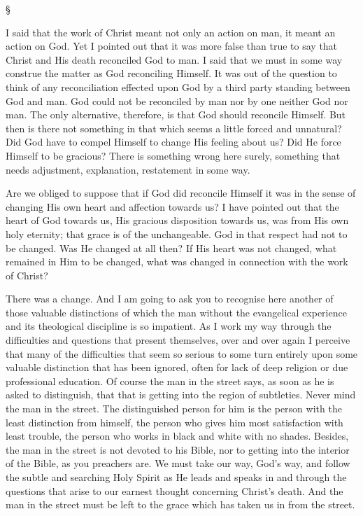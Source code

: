 \documentclass[12pt,a5paper,twoside,titlepage]{book}
\begin{document}
\begin{center}
\S
\end{center}

I said that the work of Christ meant not only 
an action on man, it meant an action on God. 
Yet I pointed out that it was more false than 
true to say that Christ and His death reconciled 
God to man. I said that we must in some way 
construe the matter as God reconciling Himself. 
It was out of the question to think of any 
reconciliation effected upon God by a third 
party standing between God and man. God 
could not be reconciled by man nor by one 
neither God nor man. The only alternative, 
therefore, is that God should reconcile Himself. 
But then is there not something in that which 
seems a little forced and unnatural? Did God 
have to compel Himself to change His feeling 
about us? Did He force Himself to be gracious? 
There is something wrong here surely, something 
that needs adjustment, explanation, restatement 
in some way. 

Are we obliged to suppose that if God did 
reconcile Himself it was in the sense of changing 
His own heart and affection towards us? I 
have pointed out that the heart of God towards 
us, His gracious disposition towards us, was 
from His own holy eternity; that grace is of the 
unchangeable. God in that respect had not to 
be changed. Was He changed at all then? If 
His heart was not changed, what remained in 
Him to be changed, what was changed in 
connection with the work of Christ? 

There was a change. And I am going to ask 
you to recognise here another of those valuable 
distinctions of which the man without the evangelical 
experience and its theological discipline 
is so impatient. As I work my way through 
the difficulties and questions that present themselves, 
over and over again I perceive that many 
of the difficulties that seem so serious to some 
turn entirely upon some valuable distinction 
that has been ignored, often for lack of deep religion 
or due professional education. Of course 
the man in the street says, as soon as he is 
asked to distinguish, that that is getting into 
the region of subtleties. Never mind the man 
in the street. The distinguished person for him 
is the person with the least distinction from 
himself, the person who gives him most satisfaction 
with least trouble, the person who works 
in black and white with no shades. Besides, the 
man in the street is not devoted to his Bible, nor 
to getting into the interior of the Bible, as you 
preachers are. We must take our way, God's 
way, and follow the subtle and searching Holy 
Spirit as He leads and speaks in and through 
the questions that arise to our earnest thought 
concerning Christ's death. And the man in the 
street must be left to the grace which has taken 
us in from the street. 
\end{document}
